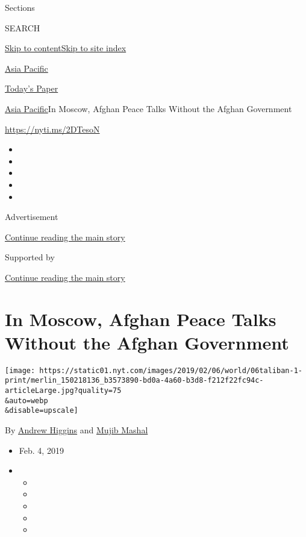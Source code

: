 Sections

SEARCH

\protect\hyperlink{site-content}{Skip to
content}\protect\hyperlink{site-index}{Skip to site index}

\href{https://www.nytimes.com/section/world/asia}{Asia Pacific}

\href{https://myaccount.nytimes.com/auth/login?response_type=cookie\&client_id=vi}{}

\href{https://www.nytimes.com/section/todayspaper}{Today's Paper}

\href{/section/world/asia}{Asia Pacific}\textbar{}In Moscow, Afghan
Peace Talks Without the Afghan Government

\url{https://nyti.ms/2DTesoN}

\begin{itemize}
\item
\item
\item
\item
\item
\end{itemize}

Advertisement

\protect\hyperlink{after-top}{Continue reading the main story}

Supported by

\protect\hyperlink{after-sponsor}{Continue reading the main story}

\hypertarget{in-moscow-afghan-peace-talks-without-the-afghan-government}{%
\section{In Moscow, Afghan Peace Talks Without the Afghan
Government}\label{in-moscow-afghan-peace-talks-without-the-afghan-government}}

\texttt{[image: https://static01.nyt.com/images/2019/02/06/world/06taliban-1-print/merlin\_150218136\_b3573890-bd0a-4a60-b3d8-f212f22fc94c-articleLarge.jpg?quality=75\\\&auto=webp\\\&disable=upscale]}

By \href{https://www.nytimes.com/by/andrew-higgins}{Andrew Higgins} and
\href{https://www.nytimes.com/by/mujib-mashal}{Mujib Mashal}

\begin{itemize}
\item
  Feb. 4, 2019
\item
  \begin{itemize}
  \item
  \item
  \item
  \item
  \item
  \end{itemize}
\end{itemize}

